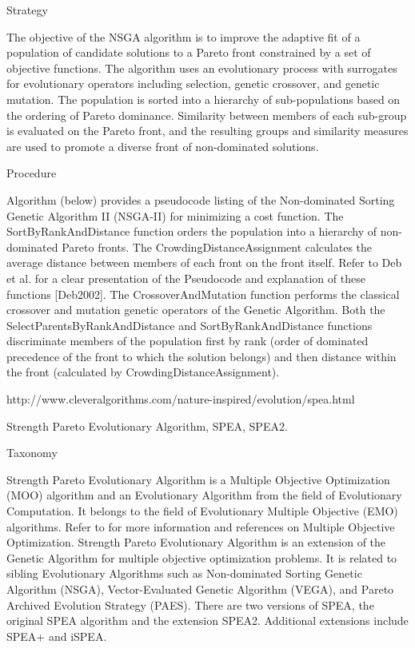 \documentclass[12pt,oneside,draft]{fithesis2}
\begin{document}
Strategy

The objective of the NSGA algorithm is to improve the adaptive fit of a population of candidate solutions to a Pareto front constrained by a set of objective functions. The algorithm uses an evolutionary process with surrogates for evolutionary operators including selection, genetic crossover, and genetic mutation. The population is sorted into a hierarchy of sub-populations based on the ordering of Pareto dominance. Similarity between members of each sub-group is evaluated on the Pareto front, and the resulting groups and similarity measures are used to promote a diverse front of non-dominated solutions.

Procedure

Algorithm (below) provides a pseudocode listing of the Non-dominated Sorting Genetic Algorithm II (NSGA-II) for minimizing a cost function. The SortByRankAndDistance function orders the population into a hierarchy of non-dominated Pareto fronts. The CrowdingDistanceAssignment calculates the average distance between members of each front on the front itself. Refer to Deb et al. for a clear presentation of the Pseudocode and explanation of these functions [Deb2002]. The CrossoverAndMutation function performs the classical crossover and mutation genetic operators of the Genetic Algorithm. Both the SelectParentsByRankAndDistance and SortByRankAndDistance functions discriminate members of the population first by rank (order of dominated precedence of the front to which the solution belongs) and then distance within the front (calculated by CrowdingDistanceAssignment).



http://www.cleveralgorithms.com/nature-inspired/evolution/spea.html

Strength Pareto Evolutionary Algorithm, SPEA, SPEA2.

Taxonomy

Strength Pareto Evolutionary Algorithm is a Multiple Objective Optimization (MOO) algorithm and an Evolutionary Algorithm from the field of Evolutionary Computation. It belongs to the field of Evolutionary Multiple Objective (EMO) algorithms. Refer to for more information and references on Multiple Objective Optimization. Strength Pareto Evolutionary Algorithm is an extension of the Genetic Algorithm for multiple objective optimization problems. It is related to sibling Evolutionary Algorithms such as Non-dominated Sorting Genetic Algorithm (NSGA), Vector-Evaluated Genetic Algorithm (VEGA), and Pareto Archived Evolution Strategy (PAES). There are two versions of SPEA, the original SPEA algorithm and the extension SPEA2. Additional extensions include SPEA+ and iSPEA.
\end{document}
